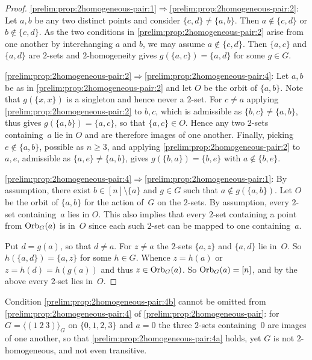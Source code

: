 \begin{proof}
\ref{prelim:prop:2homogeneous-pair:1}$\Rightarrow$\ref{prelim:prop:2homogeneous-pair:2}:
Let $a,b$ be any two distinct points and consider $\{c,d\} \ne \{a,b\}$.
Then $a \notin \{c,d\}$ or $b \notin \{c,d\}$.
As the two conditions in \cref{prelim:prop:2homogeneous-pair:2} arise from one another by
interchanging $a$ and $b$, we may assume $a \notin \{c,d\}$.
Then $\{a,c\}$ and $\{a,d\}$ are $2$-sets and $2$-homogeneity gives
$g(\{a,c\}) = \{a,d\}$ for some $g \in G$.
	
	\ref{prelim:prop:2homogeneous-pair:2}$\Rightarrow$\ref{prelim:prop:2homogeneous-pair:4}:
	Let $a,b$ be as in \cref{prelim:prop:2homogeneous-pair:2} and let $O$ be the orbit of
	$\{a,b\}$.
	Note that $g(\{x,x\})$ is a singleton and hence never a $2$-set.
	For $c \ne a$ applying \cref{prelim:prop:2homogeneous-pair:2} to $b,c$, which is admissible
	as $\{b,c\} \ne \{a,b\}$, thus gives $g(\{a,b\}) = \{a,c\}$, so that $\{a,c\} \in O$.
	Hence any two $2$-sets containing~$a$ lie in $O$ and are therefore images of one another.
	Finally, picking $e \notin \{a,b\}$, possible as $n \ge 3$, and applying
	\ref{prelim:prop:2homogeneous-pair:2} to $a,e$, admissible as $\{a,e\} \ne \{a,b\}$, gives
	$g(\{b,a\}) = \{b,e\}$ with $a \notin \{b,e\}$.

\ref{prelim:prop:2homogeneous-pair:4}$\Rightarrow$\ref{prelim:prop:2homogeneous-pair:1}:
By assumption, there exist $b \in [n] \setminus \{a\}$ and $g \in G$
such that $a \notin g(\{a,b\})$.
Let $O$ be the orbit of $\{a,b\}$ for the action of~$G$ on the $2$-sets.
By assumption, every $2$-set containing~$a$ lies in $O$.
This also implies that every $2$-set containing
a point from $\Orbit{a}{G}$ is in~$O$
since each such $2$-set can be mapped to one containing~$a$.

Put $d = g(a)$, so that $d \ne a$. For $z \ne a$
the $2$-sets $\{a,z\}$ and $\{a,d\}$ lie in~$O$.
So $h(\{a,d\}) = \{a,z\}$ for some $h \in G$.
Whence $z = h(a)$ or $z = h(d) = h(g(a))$
and thus $z \in \Orbit{a}{G}$.
So $\Orbit{a}{G} = [n]$, and by the above every $2$-set lies in~$O$.
\end{proof}

\begin{remark}
	Condition \ref{prelim:prop:2homogeneous-pair:4b} cannot be omitted from
	\cref{prelim:prop:2homogeneous-pair:4} of \cref{prelim:prop:2homogeneous-pair}:
	for $G = \langle (1~2~3) \rangle_G$ on $\{0,1,2,3\}$ and $a = 0$ the three $2$-sets
	containing~$0$ are images of one another, so that
	\ref{prelim:prop:2homogeneous-pair:4a} holds, yet $G$ is not $2$-homogeneous, and not even
	transitive.
\end{remark}



